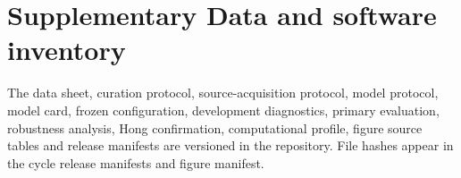 \documentclass[11pt]{article}
\begin{document}
\begin{landscape}
\begin{table}[p]
\centering
\scriptsize
\caption*{Supplementary Table S11}
\end{table}
\end{landscape}

\begin{landscape}
\begin{table}[p]
\centering
\scriptsize
\caption*{Supplementary Table S12}
\end{table}
\end{landscape}

\clearpage

\section*{Supplementary Data and software inventory}

The data sheet, curation protocol, source-acquisition protocol, model protocol, model card, frozen configuration, development diagnostics, primary evaluation, robustness analysis, Hong confirmation, computational profile, figure source tables and release manifests are versioned in the repository. File hashes appear in the cycle release manifests and figure manifest.
\end{document}
